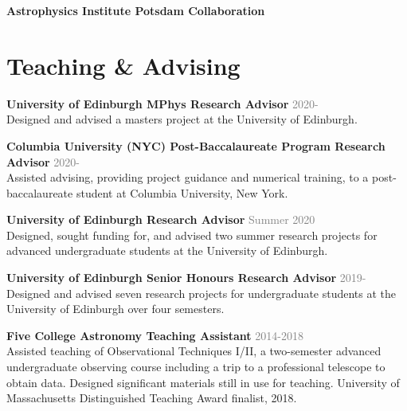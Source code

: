 \documentclass[margin, a4paper,11pt]{res} %
\begin{document}
\begin{resume}
{\bf Astrophysics Institute Potsdam Collaboration}\\



\section{\sc \textcolor{redshade}{Teaching \& Advising}}

{\bf University of Edinburgh MPhys Research Advisor} \hfill\textcolor{grey}{2020-}\\
Designed and advised a masters project at the University of Edinburgh.

{\bf Columbia University (NYC) Post-Baccalaureate Program Research Advisor} \hfill\textcolor{grey}{2020-}\\
Assisted advising, providing project guidance and numerical training, to a post-baccalaureate student at Columbia University, New York.

{\bf University of Edinburgh Research Advisor} \hfill\textcolor{grey}{Summer 2020}\\
Designed, sought funding for, and advised two summer research projects for advanced undergraduate students at the University of Edinburgh.

{\bf University of Edinburgh Senior Honours Research Advisor} \hfill\textcolor{grey}{2019-}\\
Designed and advised seven research projects for undergraduate students at the University of Edinburgh over four semesters.

{\bf Five College Astronomy Teaching Assistant} \hfill \textcolor{grey}{2014-2018}\\
Assisted teaching of Observational Techniques I/II, a two-semester advanced undergraduate observing course including a trip to a professional telescope to obtain data. Designed significant materials still in use for teaching. University of Massachusetts Distinguished Teaching Award finalist, 2018.



\end{resume}
\end{document}
